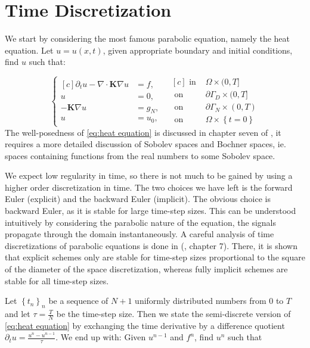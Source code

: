 \documentclass[../Main/main.tex]{subfiles}
\begin{document}
	\section*{Time Discretization}	
		We start by considering the most famous parabolic equation, namely the heat equation. Let $u = u(x,t)$, given appropriate boundary and initial conditions, find $u$ such that:
	
	\begin{equation}\label{eq:heat equation}
		\left \{
		\begin{aligned}[c]
			\partial_t u - \nabla \cdot \pmb{K} \nabla u &= f, \\
			u &= 0, \\
			-\pmb{K}\nabla u &= g_N,\\
			u &= u_0,
		\end{aligned}
		\ \ \
		\begin{aligned}[c]
			\text{ in }& \Omega \times (0,T]\\
			\text{ on }& \partial \Gamma_D \times (0,T]\\
			\text{ on }& \partial \Gamma_N \times (0,T)\\
			\text{ on }& \Omega \times \left\{t=0\right \}
		\end{aligned}
	\right.
	\end{equation}
	The well-posedness of \eqref{eq:heat equation} is discussed in chapter seven of \cite{evans10}, it requires a more detailed discussion of Sobolev spaces and Bochner spaces, ie. spaces containing functions from the real numbers to some Sobolev space.\par
	We expect low regularity in time, so there is not much to be  gained by using a higher order discretization in time. The two choices we have left is the forward Euler (explicit) and the backward Euler (implicit). The obvious choice is backward Euler, as it is stable for large time-step sizes. This can be understood intuitively by considering the parabolic nature of the equation, the signals propagate through the domain instantaneously. A careful analysis of time discretizations of parabolic equations is done in (\cite{Knabner}, chapter 7).  There, it is shown that explicit schemes only are stable for time-step sizes proportional to the square of the diameter of the space discretization, whereas fully implicit schemes are stable for all time-step sizes. \par  Let $\left \{ t_n \right \}_n$ be a sequence of $N+1$ uniformly distributed numbers from $0$ to $T$ and let $\tau = \frac{T}{N}$ be the time-step size. Then we state the semi-discrete version of \eqref{eq:heat equation} by exchanging the time derivative by a difference quotient $\partial_t u = \frac{u^n-u^{n-1}}{\tau}$. We end up with: Given $u^{n-1}$ and $f^n$, find $u^n$ such that
\end{document}
